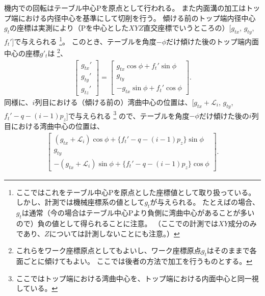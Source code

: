 \clearpage
機内での回転はテーブル中心Pを原点として行われる。
また内面溝の加工はトップ端における内径中心を基準にして切削を行う。
傾ける前のトップ端内径中心$g_t$の座標は実測により（Pを中心とした$XYZ$直交座標でいうところの）[$g_{tx}$, $g_{ty}$, $f_t'$]で与えられる
\footnote{ここではこれをテーブル中心Pを原点とした座標値として取り扱っている。
しかし、計測では機械座標系の値として$g_t$が与えられる。
たとえば\DMname の場合、$g_t$は通常（今の場合はテーブル中心Pより負側に湾曲中心があることが多いので）負の値として得られることに注意。
（ここでの計測では$XY$成分のみであり、$Z$については計測しないことにも注意。）}。
このとき、テーブルを角度$-\phi$だけ傾けた後のトップ端内面中心の座標$g'_t$は
\footnote{これらをワーク座標原点としてもよいし、ワーク座標原点$g_t$はそのままで各面ごとに傾けてもよい。
ここでは後者の方法で加工を行うものとする。}、
\begin{align}
  \label{eq:afterPhiTCenterFromO}
  \left[
  \begin{array}{c}
    g_{tx}'\\
    g_{ty}'\\
    g_{tz}'
  \end{array}
  \right]
  =\left[
   \begin{array}{c}
     g_{tx}\cos\phi+f_t'\sin\phi\\
     g_{ty}\\
     -g_{tx}\sin\phi+f_t'\cos\phi
   \end{array}
   \right].
   \end{align}
同様に、$i$列目における（傾ける前の）湾曲中心の位置は、[$g_{tx}+\mathcal L_i$, $g_{ty}$, $f_t'-q-(i-1)p_z$]で与えられる
\footnote{ここではトップ端における湾曲中心を、トップ端における内面中心と同一視している。}
ので、テーブルを角度$-\phi$だけ傾けた後の$i$列目における湾曲中心の位置は、
\begin{align*}
  \left[
  \begin{array}{c}
    (g_{tx}+\mathcal L_i)\cos\phi+\{f_t'-q-(i-1)p_z\}\sin\phi\\
    g_{ty}\\
    -(g_{tx}+\mathcal L_i)\sin\phi+\{f_t'-q-(i-1)p_z\}\cos\phi
  \end{array}
  \right].
\end{align*}
